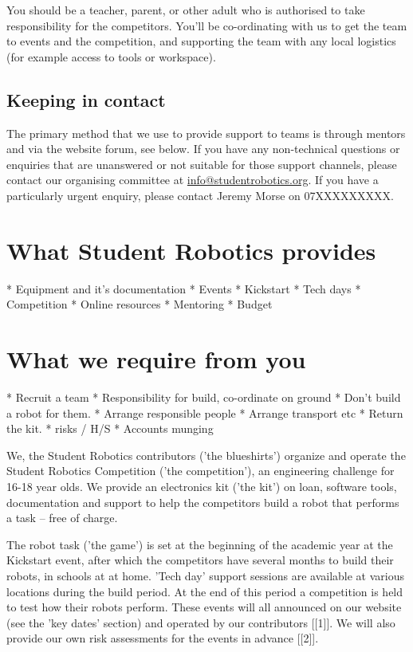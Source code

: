 \documentclass[a4paper]{article}
\begin{document}
You should be a teacher, parent, or other adult who is authorised to take
responsibility for the competitors. You'll be co-ordinating with us to get the
team to events and the competition, and supporting the team with any local
logistics (for example access to tools or workspace).

\subsection*{Keeping in contact}

The primary method that we use to provide support to teams is through mentors
and via the website forum, see below. If you have any non-technical questions
or enquiries that are unanswered or not suitable for those support channels,
please contact our organising committee at \url{info@studentrobotics.org}. If
you have a particularly urgent enquiry, please contact Jeremy Morse on
07XXXXXXXXX.

\section*{What Student Robotics provides}

 * Equipment and it's documentation
 * Events
  * Kickstart
  * Tech days
  * Competition
 * Online resources
 * Mentoring
 * Budget

\section*{What we require from you}

 * Recruit a team
 * Responsibility for build, co-ordinate on ground
   * Don't build a robot for them.
 * Arrange responsible people
 * Arrange transport etc
 * Return the kit.
 * risks / H/S
 * Accounts munging
 

We, the Student Robotics contributors ('the blueshirts') organize and
operate the Student Robotics Competition ('the competition'), an
engineering challenge for 16-18 year olds. We provide an electronics kit
('the kit') on loan, software tools, documentation and support to help
the competitors build a robot that performs a task -- free of charge.

The robot task ('the game') is set at the beginning of the academic year
at the Kickstart event, after which the competitors have several months
to build their robots, in schools at at home. 'Tech day' support
sessions are available at various locations during the build period. At
the end of this period a competition is held to test how their robots
perform. These events will all announced on our website (see the 'key
dates' section) and operated by our contributors [[1]]. We will also
provide our own risk assessments for the events in advance [[2]].
\end{document}
